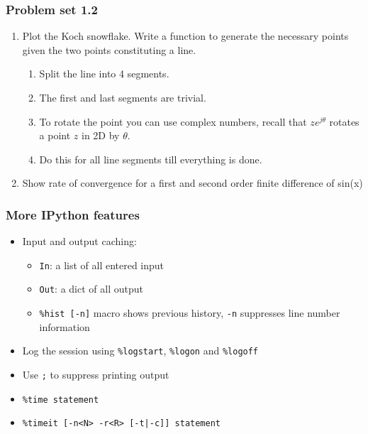 \documentclass[14pt,compress]{beamer}
\newcounter{time}
\newcommand{\inctime}[1]{\addtocounter{time}{#1}{\tiny \thetime\ m}}
\begin{document}
\begin{frame}
  \frametitle{Problem set 1.2}
  \begin{enumerate}

      \item Plot the Koch snowflake.  Write a function to generate the
          necessary points given the two points constituting a line.
          \pause
          \begin{enumerate}
              \item Split the line into 4 segments.
              \item The first and last segments are trivial.
              \item To rotate the point you can use complex numbers,
                  recall that $z e^{j \theta}$ rotates a point $z$ in 2D
                  by $\theta$.
              \item Do this for all line segments till everything is
                  done.
          \end{enumerate}
      \item Show rate of convergence for a first and second order finite
          difference of sin(x)
\end{enumerate}
\inctime{30}
\end{frame}



\begin{frame}[fragile]
  \frametitle{More IPython features}
  \begin{itemize}
  \item Input and output caching:
    \begin{itemize}
    \item \verb+In+: a list of all entered input
    \item \verb+Out+: a dict of all output
    \item \verb+%hist [-n]+ macro shows previous history, \verb+-n+
      suppresses line number information
    \end{itemize}
  \item Log the session using \verb+%logstart+, \verb+%logon+ and
    \verb+%logoff+
  \item Use \verb+;+ to suppress printing output
  \item \verb+%time statement+
  \item \verb+%timeit [-n<N> -r<R> [-t|-c]] statement+

  \end{itemize}
\end{frame}
\end{document}
